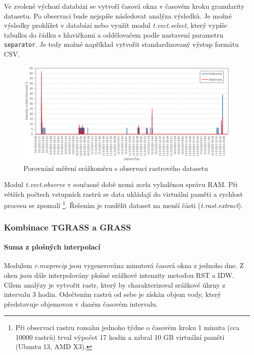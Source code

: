 \documentclass[a4paper,12pt,oneside]{report}
\begin{document}
Ve zvolené výchozí databázi se vytvoří časová okna v časovém kroku
 granularity datasetu.  Po observaci bude nejspíše následovat analýza
 výsledků. Je možné výsledky prohlížet v databázi nebo využít modul
 \textit{t.vect.select}, který vypíše tabulku do řádku s hlavičkami a
 oddělovačem podle nastavení parametru \texttt{separator}. Je tedy
 možné například vytvořit standardizovaný výstup formátu CSV.
 
\begin{figure}[h!]
    \centering
    \includegraphics[width=\textwidth]{./img/temporal/grafobs.png}
    \caption[Timeline]{\centering  Porovnání měření srážkoměru s observací rastrového datasetu}
 \end{figure}  




 Modul \textit{t.vect.observe} v současné době nemá zcela vyladěnou
 správu    \acs{RAM}. Při větších počtech vstupních rastrů se data
 ukládají do virtuální paměti a rychlost procesu se
 zpomalí \footnote{Při observaci rastru rozsahu jednoho týdne o časovém
   kroku 1 minuta (cca 10000 rastrů) trval výpočet 17 hodin a zabral
   10 GB virtuální paměti (Ubuntu 13, AMD X3).}. Řešením je rozdělit
 dataset na menší části (\textit{t.rast.extract}).


\subsubsection{Kombinace TGRASS a GRASS}

\paragraph*{Suma z plošných interpolací}
Modulem \emph{r.mwprecip} jsou vygenerována minutová časová okna z
jednoho dne. Z oken jsou dále interpolovány plošné srážkové intenzity
metodou RST a IDW. Cílem analýzy je vytvořit rastr, který by
charakterizoval srážkové úhrny z intervalu 3 hodin. Odečtením rastrů od sebe je získán objem vody, který představuje objemovou v daném časovém intervalu.
\end{document}
